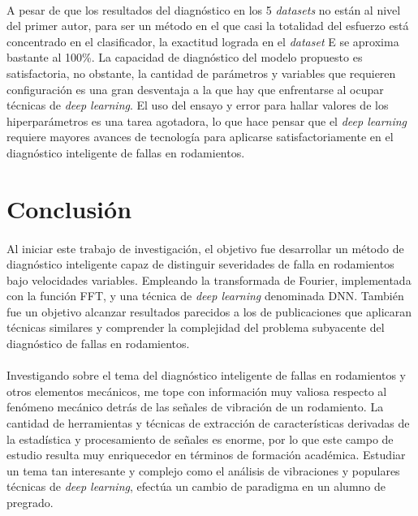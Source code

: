 \documentclass[12pt]{article}%
\begin{document}
\paragraph{}
A pesar de que los resultados del diagnóstico en los 5 \textit{datasets} no están al nivel del primer autor, para ser un método en el que casi la totalidad del esfuerzo está concentrado en el clasificador, la exactitud lograda en el \textit{dataset} E se aproxima bastante al 100\%. La capacidad de diagnóstico del modelo propuesto es satisfactoria, no obstante, la cantidad de parámetros y variables que requieren configuración es una gran desventaja a la que hay que enfrentarse al ocupar técnicas de \textit{deep learning}. El uso del ensayo y error para hallar valores de los hiperparámetros es una tarea agotadora, lo que hace pensar que el \textit{deep learning} requiere mayores avances de tecnología para aplicarse satisfactoriamente en el diagnóstico inteligente de fallas en rodamientos.



\section{Conclusión}
\paragraph{}
Al iniciar este trabajo de investigación, el objetivo fue desarrollar un método de diagnóstico inteligente capaz de distinguir severidades de falla en rodamientos bajo velocidades variables. Empleando la transformada de Fourier, implementada con la función FFT, y una técnica de \textit{deep learning} denominada DNN. También fue un objetivo alcanzar resultados parecidos a los de publicaciones que aplicaran técnicas similares y comprender la complejidad del problema subyacente del diagnóstico de fallas en rodamientos.

\paragraph{}
Investigando sobre el tema del diagnóstico inteligente de fallas en rodamientos y otros elementos mecánicos, me tope con información muy valiosa respecto al fenómeno mecánico detrás de las señales de vibración de un rodamiento. La cantidad de herramientas y técnicas de extracción de características derivadas de la estadística y procesamiento de señales es enorme, por lo que este campo de estudio resulta muy enriquecedor en términos de formación académica. Estudiar un tema tan interesante y complejo como el análisis de vibraciones y populares técnicas de \textit{deep learning}, efectúa un cambio de paradigma en un alumno de pregrado.
\end{document}
